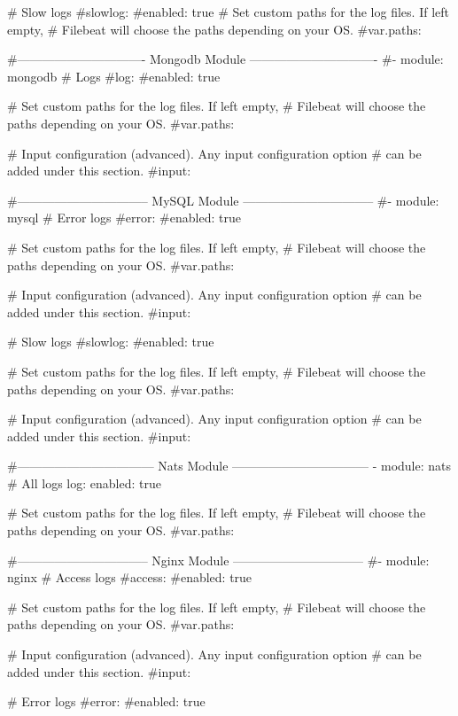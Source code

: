   # Slow logs
  #slowlog:
    #enabled: true
    # Set custom paths for the log files. If left empty,
    # Filebeat will choose the paths depending on your OS.
    #var.paths:

#------------------------------- Mongodb Module -------------------------------
#- module: mongodb
  # Logs
  #log:
    #enabled: true

    # Set custom paths for the log files. If left empty,
    # Filebeat will choose the paths depending on your OS.
    #var.paths:

    # Input configuration (advanced). Any input configuration option
    # can be added under this section.
    #input:

#-------------------------------- MySQL Module --------------------------------
#- module: mysql
  # Error logs
  #error:
    #enabled: true

    # Set custom paths for the log files. If left empty,
    # Filebeat will choose the paths depending on your OS.
    #var.paths:

    # Input configuration (advanced). Any input configuration option
    # can be added under this section.
    #input:

  # Slow logs
  #slowlog:
    #enabled: true

    # Set custom paths for the log files. If left empty,
    # Filebeat will choose the paths depending on your OS.
    #var.paths:

    # Input configuration (advanced). Any input configuration option
    # can be added under this section.
    #input:

#--------------------------------- Nats Module ---------------------------------
- module: nats
  # All logs
  log:
    enabled: true

    # Set custom paths for the log files. If left empty,
    # Filebeat will choose the paths depending on your OS.
    #var.paths:

#-------------------------------- Nginx Module --------------------------------
#- module: nginx
  # Access logs
  #access:
    #enabled: true

    # Set custom paths for the log files. If left empty,
    # Filebeat will choose the paths depending on your OS.
    #var.paths:

    # Input configuration (advanced). Any input configuration option
    # can be added under this section.
    #input:

  # Error logs
  #error:
    #enabled: true

